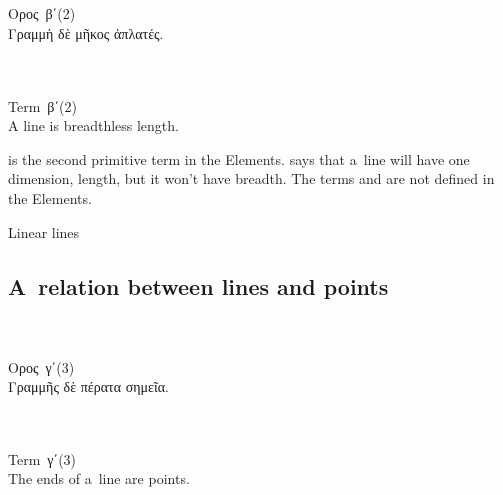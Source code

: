 {\small
\setlength{\parindent}{0pt}

\nopagebreak%
\begin{multicols}{2}
%
\\
\\[.3em]
\textgreek{Ορος}~\textgreek{β΄}\:(2)\\[.1em]
\textgreek{Γραμμὴ δὲ μῆκος ἀπλατές.}

\columnbreak
%
\\
\\[.3em]
Term~\textgreek{β΄}\:(2)\\[.1em]
A line is breadthless length.
%
\end{multicols}
\par}

 is the second primitive term in the Elements.
says that a~line will have one dimension, length, but it won’t have breadth.
The terms  and  are not defined in the Elements.

Linear lines

\subsection{A~relation between lines and points}

{\small
\setlength{\parindent}{0pt}

\nopagebreak%
\begin{multicols}{2}
%
\\
\\[.3em]
\textgreek{Ορος}~\textgreek{γ΄}\:(3)\\[.1em]
\textgreek{Γραμμῆς δὲ πέρατα σημεῖα.}

\columnbreak
%
\\
\\[.3em]
Term~\textgreek{γ΄}\:(3)\\[.1em]
The ends of a~line are points.
%
\end{multicols}
\par}

